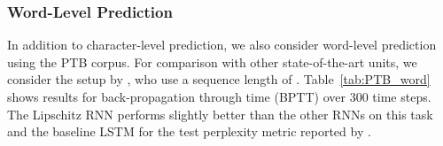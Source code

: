 \documentclass{article} \usepackage{iclr2021_conference,times}
\begin{document}
\begin{table}[!h]
	\caption{Evaluation accuracy on PTB for character-level prediction for different sequence lengths .  The * indicate results that were adopted from \citet{kerg2019non}.}
	\label{tab:PTB_character}
	\centering
\end{table}



\subsubsection{Word-Level Prediction}\label{sec:ptb_word}

In addition to character-level prediction, we also consider word-level prediction using the PTB corpus.
For comparison with other state-of-the-art units, we consider the setup by \citet{kusupati2018fastgrnn}, who use a sequence length of .
Table~\ref{tab:PTB_word} shows results for back-propagation through time (BPTT) over 300 time steps. The Lipschitz RNN performs slightly better than the other RNNs on this task and the baseline LSTM for the test perplexity metric reported by \citet{kusupati2018fastgrnn}. 
\end{document}
